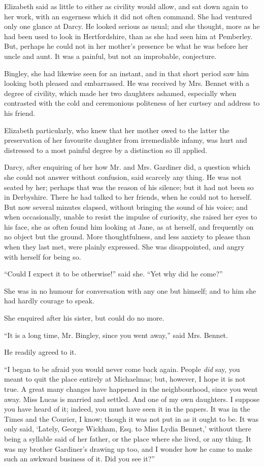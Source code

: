 Elizabeth said as little to either as civility would allow,
and sat down again to her work, with an eagerness which
it did not often command. She had ventured only one
glance at Darcy. He looked serious as usual; and she
thought, more as he had been used to look in Hertfordshire,
than as she had seen him at Pemberley. But, perhaps
he could not in her mother’s presence be what he was
before her uncle and aunt. It was a painful, but not an
improbable, conjecture.

Bingley, she had likewise seen for an instant, and in
that short period saw him looking both pleased and
embarrassed. He was received by Mrs. Bennet with
a degree of civility, which made her two daughters
ashamed, especially when contrasted with the cold and
ceremonious politeness of her curtsey and address to his
friend.

Elizabeth particularly, who knew that her mother owed
to the latter the preservation of her favourite daughter
from irremediable infamy, was hurt and distressed to
a most painful degree by a distinction so ill applied.

Darcy, after enquiring of her how Mr. and Mrs. Gardiner
did, a question which she could not answer without confusion,
said scarcely any thing. He was not seated by her;
perhaps that was the reason of his silence; but it had
not been so in Derbyshire. There he had talked to her
friends, when he could not to herself. But now several
minutes elapsed, without bringing the sound of his voice;
and when occasionally, unable to resist the impulse of
curiosity, she raised her eyes to his face, she as often
found him looking at Jane, as at herself, and frequently
on no object but the ground. More thoughtfulness, and
less anxiety to please than when they last met, were
plainly expressed. She was disappointed, and angry with
herself for being so.

“Could I expect it to be otherwise!” said she. “Yet
why did he come?”

She was in no humour for conversation with any one
but himself; and to him she had hardly courage to speak.

She enquired after his sister, but could do no more.

“It is a long time, Mr. Bingley, since you went away,”
said Mrs. Bennet.

He readily agreed to it.

“I began to be afraid you would never come back
again. People \textit{did} say, you meant to quit the place entirely
at Mich\-aelmas; but, however, I hope it is not true.
A great many changes have happened in the neighbourhood,
since you went away. Miss Lucas is married and
settled. And one of my own daughters. I suppose you
have heard of it; indeed, you must have seen it in the
papers. It was in the Times and the Courier, I know;
though it was not put in as it ought to be. It was only said,
‘Lately, George Wickham, Esq. to Miss Lydia Bennet,’
without there being a syllable said of her father, or the
place where she lived, or any thing. It was my brother
Gardiner’s drawing up too, and I wonder how he came
to make such an awkward business of it. Did you see it?”


